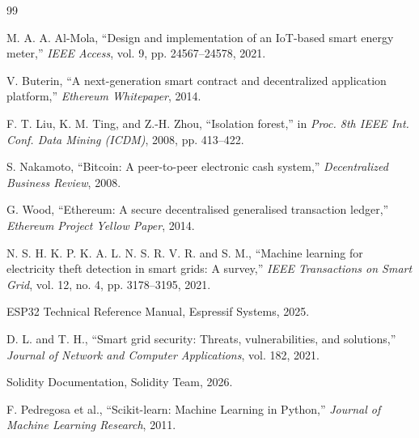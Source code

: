 \renewcommand{\bibname}{REFERENCES} 

\addcontentsline{toc}{chapter}{\bibname}

\begin{thebibliography}{99}

 M. A. A. Al-Mola, ``Design and implementation of an IoT-based smart energy meter,'' \textit{IEEE Access}, vol. 9, pp. 24567--24578, 2021.

 V. Buterin, ``A next-generation smart contract and decentralized application platform,'' \textit{Ethereum Whitepaper}, 2014.

 F. T. Liu, K. M. Ting, and Z.-H. Zhou, ``Isolation forest,'' in \textit{Proc. 8th IEEE Int. Conf. Data Mining (ICDM)}, 2008, pp. 413--422.

 S. Nakamoto, ``Bitcoin: A peer-to-peer electronic cash system,'' \textit{Decentralized Business Review}, 2008.

 G. Wood, ``Ethereum: A secure decentralised generalised transaction ledger,'' \textit{Ethereum Project Yellow Paper}, 2014.

 N. S. H. K. P. K. A. L. N. S. R. V. R. and S. M., ``Machine learning for electricity theft detection in smart grids: A survey,'' \textit{IEEE Transactions on Smart Grid}, vol. 12, no. 4, pp. 3178--3195, 2021.

 ESP32 Technical Reference Manual, Espressif Systems, 2025.

 D. L. and T. H., ``Smart grid security: Threats, vulnerabilities, and solutions,'' \textit{Journal of Network and Computer Applications}, vol. 182, 2021.

 Solidity Documentation, Solidity Team, 2026.

 F. Pedregosa et al., ``Scikit-learn: Machine Learning in Python,'' \textit{Journal of Machine Learning Research}, 2011.

\end{thebibliography}